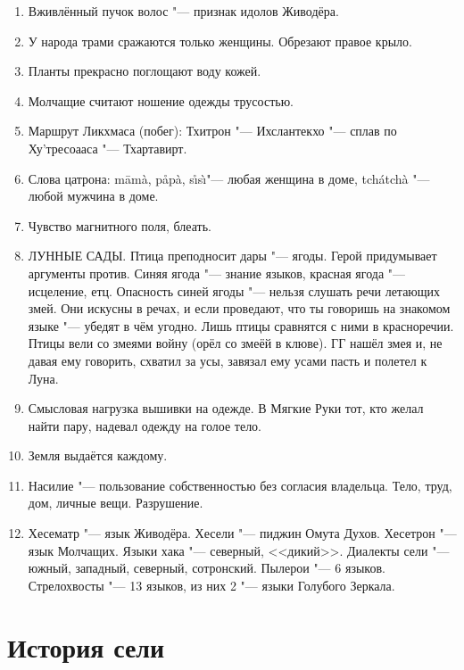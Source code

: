 \documentclass[a4paper,10pt,fleqn]{book}
\begin{document}
\begin{enumerate}
\item Вживлённый пучок волос "--- признак идолов Живодёра.

\item У народа трами сражаются только женщины.
Обрезают правое крыло.

\item Планты прекрасно поглощают воду кожей.

\item Молчащие считают ношение одежды трусостью.

\item Маршрут Ликхмаса (побег): Тхитрон "--- Ихслантекхо "--- сплав по Ху'тресоааса "--- Тхартавирт.

\item Слова цатрона: m\=am\`a, p\r{a}p\`a, s\r{\i}s\`\i "--- любая женщина в доме, tch\'atch\`a "--- любой мужчина в доме.

\item Чувство магнитного поля, блеать.

\item ЛУННЫЕ САДЫ.
Птица преподносит дары "--- ягоды.
Герой придумывает аргументы против.
Синяя ягода "--- знание языков, красная ягода "--- исцеление, етц.
Опасность синей ягоды "--- нельзя слушать речи летающих змей.
Они искусны в речах, и если проведают, что ты говоришь на знакомом языке "--- убедят в чём угодно.
Лишь птицы сравнятся с ними в красноречии.
Птицы вели со змеями войну (орёл со змеёй в клюве).
ГГ нашёл змея и, не давая ему говорить, схватил за усы, завязал ему усами пасть и полетел к Луна.

\item Смысловая нагрузка вышивки на одежде.
В Мягкие Руки тот, кто желал найти пару, надевал одежду на голое тело.

\item Земля выдаётся каждому.

\item Насилие "--- пользование собственностью без согласия владельца.
Тело, труд, дом, личные вещи.
Разрушение.

\item Хесематр "--- язык Живодёра.
Хесели "--- пиджин Омута Духов.
Хесетрон "--- язык Молчащих.
Языки хака "--- северный, <<дикий>>.
Диалекты сели "--- южный, западный, северный, сотронский.
Пылерои "--- 6 языков. Стрелохвосты "--- 13 языков, из них 2 "--- языки Голубого Зеркала.
\end{enumerate}

\section{История сели}
\end{document}

